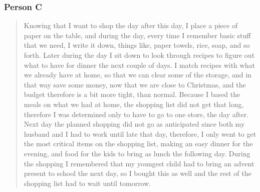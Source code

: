 \subsubsection{Person C}
\begin{quote}
Knowing that I want to shop the day after this day, I place a piece of paper on the table, and during the day, every time I remember basic stuff that we need, I write it down, things like, paper towels, rice, soap, and so forth. Later during the day I sit down to look through recipes to figure out what to have for dinner the next couple of days. I match recipes with what we already have at home, so that we can clear some of the storage, and in that way save some money, now that we are close to Christmas, and the budget therefore is a bit more tight, than normal. Because I based the meals on what we had at home, the shopping list did not get that long, therefore I was determined only to have to go to one store, the day after. Next day the planned shopping did not go as anticipated since both my husband and I had to work until late that day, therefore, I only went to get the most critical items on the shopping list, making an easy dinner for the evening, and food for the kids to bring as lunch the following day. During the shopping I remembered that my youngest child had to bring an advent present to school the next day, so I bought this as well and the rest of the shopping list had to wait until tomorrow.
\end{quote}

